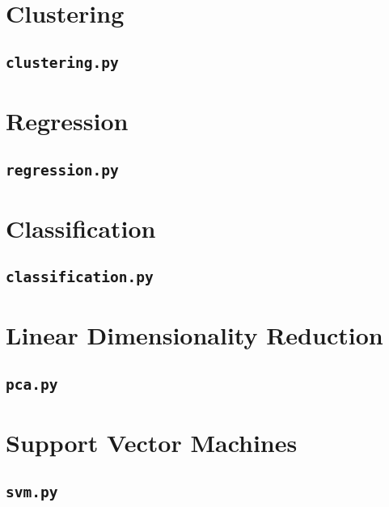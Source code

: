 	\section{Clustering}
		\subsection{\texttt{clustering.py}}

	\section{Regression}
		\subsection{\texttt{regression.py}}

	\section{Classification}
		\subsection{\texttt{classification.py}}
	
	\section{Linear Dimensionality Reduction}
		\subsection{\texttt{pca.py}}
	
	\section{Support Vector Machines}
		\subsection{\texttt{svm.py}}
